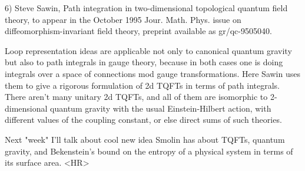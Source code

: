 6)  Steve Sawin, Path integration in two-dimensional topological quantum 
field theory, to appear in the October 1995 Jour. Math. Phys. issue on 
diffeomorphism-invariant field theory, preprint available as gr/qc-9505040.

Loop representation ideas are applicable not only to canonical quantum
gravity but also to path integrals in gauge theory, because in both cases
one is doing integrals over a space of connections mod gauge 
transformations.  Here Sawin uses them to give a rigorous formulation 
of 2d TQFTs in terms of path integrals.  There aren't many unitary 
2d TQFTs, and all of them are isomorphic to 2-dimensional quantum 
gravity with the usual Einstein-Hilbert action, with different values of the 
coupling constant, or else direct sums of such theories.    

Next "week" I'll talk about cool new idea Smolin has about TQFTs,
quantum gravity, and Bekenstein's bound on the entropy of a
physical system in terms of its surface area.
<HR>



